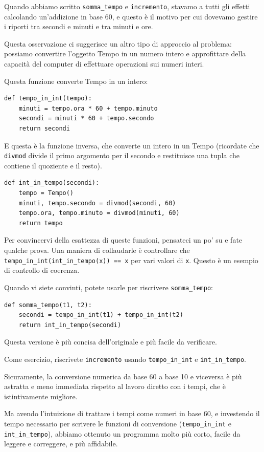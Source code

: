 \documentclass[10pt]{book}
\begin{document}
Quando abbiamo scritto \verb"somma_tempo" e {\tt incremento}, stavamo a tutti gli effetti calcolando un'addizione in base 60, e questo è il motivo per cui dovevamo gestire i riporti tra secondi e minuti e tra minuti e ore.

Questa osservazione ci suggerisce un altro tipo di approccio al problema: possiamo convertire l'oggetto Tempo in un numero intero e approfittare della capacità del computer di effettuare operazioni sui numeri interi.

Questa funzione converte Tempo in un intero:

\begin{verbatim}
def tempo_in_int(tempo):
    minuti = tempo.ora * 60 + tempo.minuto
    secondi = minuti * 60 + tempo.secondo
    return secondi
\end{verbatim}
%
E questa è la funzione inversa, che converte un intero in un Tempo (ricordate che {\tt divmod} divide il primo argomento per il secondo e restituisce una tupla che contiene il quoziente e il resto).

\begin{verbatim}
def int_in_tempo(secondi):
    tempo = Tempo()
    minuti, tempo.secondo = divmod(secondi, 60)
    tempo.ora, tempo.minuto = divmod(minuti, 60)
    return tempo
\end{verbatim}
%
Per convincervi della esattezza di queste funzioni, pensateci un po' su e fate qualche prova. Una maniera di collaudarle è controllare che \verb"tempo_in_int(int_in_tempo(x)) == x" per vari valori di {\tt x}. Questo è un esempio di controllo di coerenza.

Quando vi siete convinti, potete usarle per riscrivere \verb"somma_tempo":

\begin{verbatim}
def somma_tempo(t1, t2):
    secondi = tempo_in_int(t1) + tempo_in_int(t2)
    return int_in_tempo(secondi)
\end{verbatim}
%
Questa versione è più concisa dell'originale e più facile da verificare.

Come esercizio, riscrivete {\tt incremento} usando \verb"tempo_in_int" e \verb"int_in_tempo".

Sicuramente, la conversione numerica da base 60 a base 10 e viceversa è più astratta e meno immediata rispetto al lavoro diretto con i tempi, che è istintivamente migliore.

Ma avendo l'intuizione di trattare i tempi come numeri in base 60, e    investendo il tempo necessario per scrivere le funzioni di conversione (\verb"tempo_in_int" e \verb"int_in_tempo"), abbiamo ottenuto un programma molto più corto, facile da leggere e correggere, e più affidabile.
\end{document}

